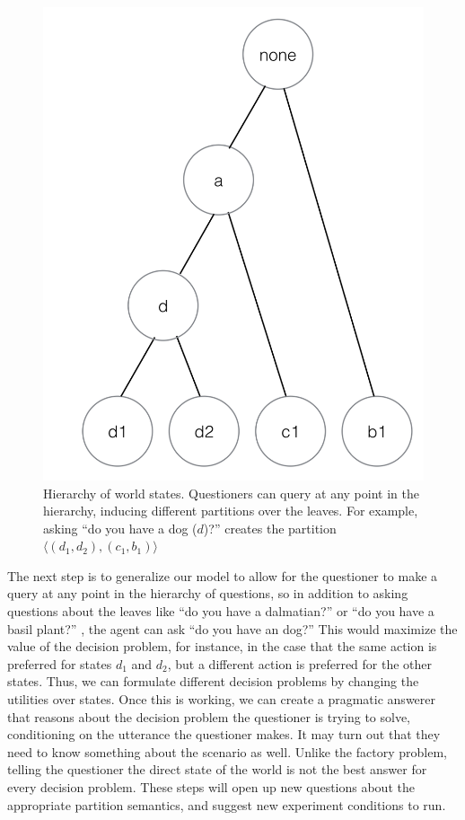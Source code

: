 \documentclass[12pt]{amsart}
\begin{document}
\begin{figure}
\includegraphics[scale=.5]{hierarchy.png}
\caption{Hierarchy of world states. Questioners can query at any point in the hierarchy, inducing different partitions over the leaves. For example, asking ``do you have a dog ($d$)?'' creates the partition $\langle (d_1, d_2), (c_1, b_1)\rangle$}
\label{tree}
\end{figure}

The next step is to generalize our model to allow for the questioner to make a query at any point in the hierarchy of questions, so in addition to asking questions about the leaves like ``do you have a dalmatian?'' or ``do you have a basil plant?'' , the agent can ask ``do you have an dog?'' This would maximize the value of the decision problem, for instance, in the case that the same action is preferred for states $d_1$ and $d_2$, but a different action is preferred for the other states. Thus, we can formulate different decision problems by changing the utilities over states. Once this is working, we can create a pragmatic answerer that reasons about the decision problem the questioner is trying to solve, conditioning on the utterance the questioner makes. It may turn out that they need to know something about the scenario as well. Unlike the factory problem, telling the questioner the direct state of the world is not the best answer for every decision problem. These steps will open up new questions about the appropriate partition semantics, and suggest new experiment conditions to run.
\end{document}
